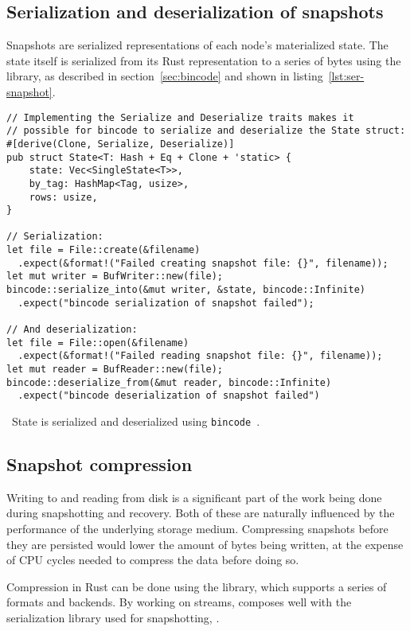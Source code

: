 \subsection{Serialization and deserialization of snapshots}

Snapshots are serialized representations of each node's materialized state. The
state itself is serialized from its Rust representation to a series of bytes
using the  library, as described in section~\ref{sec:bincode} and
shown in listing~\ref{lst:ser-snapshot}.

\begin{listing}[H]
  \begin{verbatim}
// Implementing the Serialize and Deserialize traits makes it
// possible for bincode to serialize and deserialize the State struct:
#[derive(Clone, Serialize, Deserialize)]
pub struct State<T: Hash + Eq + Clone + 'static> {
    state: Vec<SingleState<T>>,
    by_tag: HashMap<Tag, usize>,
    rows: usize,
}

// Serialization:
let file = File::create(&filename)
  .expect(&format!("Failed creating snapshot file: {}", filename));
let mut writer = BufWriter::new(file);
bincode::serialize_into(&mut writer, &state, bincode::Infinite)
  .expect("bincode serialization of snapshot failed");

// And deserialization:
let file = File::open(&filename)
  .expect(&format!("Failed reading snapshot file: {}", filename));
let mut reader = BufReader::new(file);
bincode::deserialize_from(&mut reader, bincode::Infinite)
  .expect("bincode deserialization of snapshot failed")
  \end{verbatim}
  \caption{\
    State is serialized and deserialized using \texttt{bincode}~\cite{bincode}.
  }\label{lst:ser-snapshot}
\end{listing}

\subsection{Snapshot compression}

Writing to and reading from disk is a significant part of the work being done
during snapshotting and recovery. Both of these are naturally influenced by the
performance of the underlying storage medium. Compressing snapshots before they
are persisted would lower the amount of bytes being written, at the expense of
CPU cycles needed to compress the data before doing so.

Compression in Rust can be done using the 
library, which supports a series of formats and
backends. By working on streams, \code{flate2} composes well with the
serialization library used for snapshotting, \code{bincode}.

